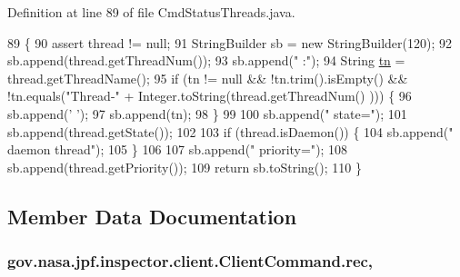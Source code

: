Definition at line 89 of file Cmd\+Status\+Threads.\+java.


\begin{DoxyCode}
89                                                         \{
90     assert thread != null;
91     StringBuilder sb = \textcolor{keyword}{new} StringBuilder(120);
92     sb.append(thread.getThreadNum());
93     sb.append(\textcolor{stringliteral}{" :"});
94     String \hyperlink{classgov_1_1nasa_1_1jpf_1_1inspector_1_1client_1_1commands_1_1_cmd_status_threads_afa72fece4b1cb85e254c99e42a8e553f}{tn} = thread.getThreadName();
95     \textcolor{keywordflow}{if} (tn != null && !tn.trim().isEmpty() && !tn.equals(\textcolor{stringliteral}{"Thread-"} + Integer.toString(thread.getThreadNum()
      ))) \{
96       sb.append(\textcolor{charliteral}{' '});
97       sb.append(tn);
98     \}
99 
100     sb.append(\textcolor{stringliteral}{" state="});
101     sb.append(thread.getState());
102 
103     \textcolor{keywordflow}{if} (thread.isDaemon()) \{
104       sb.append(\textcolor{stringliteral}{" daemon thread"});
105     \}
106 
107     sb.append(\textcolor{stringliteral}{" priority="});
108     sb.append(thread.getPriority());
109     \textcolor{keywordflow}{return} sb.toString();
110   \}
\end{DoxyCode}


\subsection{Member Data Documentation}
\subsubsection[{\texorpdfstring{rec}{rec}}]{ gov.\+nasa.\+jpf.\+inspector.\+client.\+Client\+Command.\+rec\hspace{0.3cm}{\ttfamily [protected]}, {\ttfamily [inherited]}}\hypertarget{classgov_1_1nasa_1_1jpf_1_1inspector_1_1client_1_1_client_command_af4246f2427035c72a6af45a2c61361f7}{}\label{classgov_1_1nasa_1_1jpf_1_1inspector_1_1client_1_1_client_command_af4246f2427035c72a6af45a2c61361f7}


